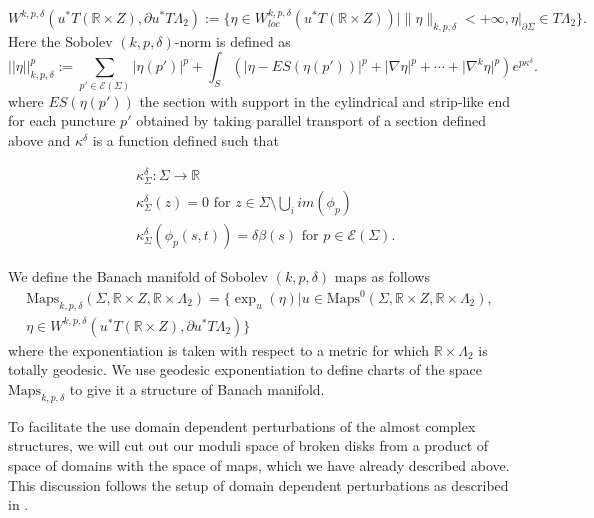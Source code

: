 \documentclass[11pt, oneside,dvipsnames]{amsart}
\renewcommand{\to}{\rightarrow}
\newcommand{\R}{\mathbb{R}}
\newcommand{\Maps}{\text{Maps}}
\renewcommand{\to}{\rightarrow}
\newcommand{\<}{\langle}
\renewcommand{\>}{\rangle}
\newcommand{\bR}{\mathbb{R}}
\newcommand{\cE}{\mathcal{E}}
\renewcommand{\to}{\rightarrow}
\theoremstyle{definition}
\theoremstyle{definition}
\numberwithin{equation}{subsection}
\begin{document}
\[
W^{k, p, \delta}(u^*T(\bR \times Z), \partial u^*T\Lambda_2):=\{ \eta\in W^{k, p, \delta}_{{loc}}(u^*T(\bR \times Z))\mid \| \eta\|_{k,p,\delta}< +\infty, \eta|_{\partial \Sigma} \in T\Lambda_2 \}.
\]
%
Here the Sobolev $(k,p,\delta)$-norm is defined as
%
\[
\lvert \lvert \eta\rvert \rvert^p_{k,p,\delta}:= \sum_{p'\in \cE(\Sigma)} \lvert \eta(p') \rvert^p + \int_{S} (\lvert \eta - ES(\eta(p'))\rvert^p + \lvert \nabla \eta\rvert^p+ \cdots + \lvert \nabla^{k} \eta\rvert^p)e^{p\kappa^{\delta}}.
\]
where $ES(\eta(p'))$ the section with support in the cylindrical and strip-like end for each puncture $p'$ obtained by taking parallel transport of a section defined above and $\kappa^\delta$ is a function defined such that

\begin{align*}
    &\kappa^\delta_\Sigma : \Sigma \to \R \\
    &\kappa^\delta_\Sigma (z) = 0 \text{ for  } z \in \Sigma \setminus \bigcup_i im(\phi_p) \\
    &\kappa^\delta_\Sigma (\phi_p (s,t)) = \delta \beta( s) \text{ for } p  \in  \cE(\Sigma).
\end{align*}

\noindent We define the Banach manifold of Sobolev $(k,p,\delta)$ maps as follows 
\begin{align*}
\Maps_{k,p,\delta}(\Sigma,\bR \times Z,\bR \times \Lambda_2) = \{ \exp_u(\eta) | u\in \Maps^0(\Sigma,\bR \times Z,\bR \times \Lambda_2),\\ \eta \in W^{k, p, \delta}(u^*T(\bR \times Z), \partial u^*T\Lambda_2) \}
\end{align*}
where the exponentiation is taken with respect to a metric for which $\bR \times \Lambda_2$ is totally geodesic. We use geodesic exponentiation to define charts of the space $\Maps_{k,p,\delta}$ to give it a structure of Banach manifold.

To facilitate the use domain dependent perturbations of the almost complex structures, we will cut out our moduli space of broken disks from a product of space of domains with the space of maps, which we have already described above. This discussion follows the setup of domain dependent perturbations as described in \cite{floflip,PW19,bcsw1}.
\end{document}
